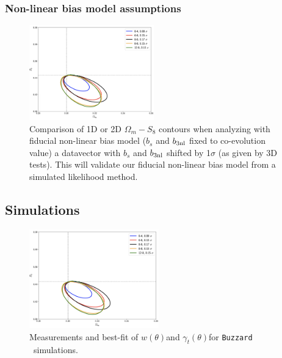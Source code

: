 \documentclass[fleqn,usenatbib]{mnras}
\newcommand{\gammat}{\ensuremath{\gamma_{t}(\theta)}}
\newcommand{\wtheta}{\ensuremath{w(\theta)}}
\newcommand{\buzzard}{\texttt{Buzzard} }
\begin{document}
\subsubsection{Non-linear bias model assumptions}
\begin{figure}
\includegraphics[width=0.48\textwidth,draft]{figs/temp.png}
\caption[]{Comparison of 1D or 2D $\Omega_m-S_8$ contours when analyzing with fiducial non-linear bias model ($b_s$ and $b_{\rm 3nl}$ fixed to co-evolution value) a datavector with $b_s$ and $b_{\rm 3nl}$ shifted by 1$\sigma$ (as given by 3D tests). This will validate our fiducial non-linear bias model from a simulated likelihood method. }
\label{fig:nlbias_bsb3nl}
\end{figure}




\subsection{Simulations}

\begin{figure}
\includegraphics[width=0.5\textwidth,draft]{figs/temp.png}
\caption[]{Measurements and best-fit of \wtheta and \gammat for \buzzard \ simulations. 
}
\label{fig:buzzard_2pt}
\end{figure}
\end{document}
